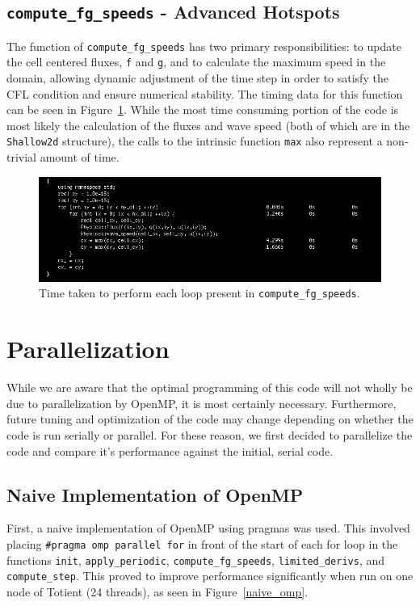 \documentclass[12pt]{article}
\begin{document}
		\subsection{\texttt{compute\_fg\_speeds} - Advanced Hotspots}
		The function of \texttt{compute\_fg\_speeds} has two primary responsibilities: to update the cell centered fluxes, \texttt{f} and \texttt{g}, and to calculate the maximum speed in the domain, allowing dynamic adjustment of the time step in order to satisfy the CFL condition and ensure numerical stability. The timing data for this function can be seen in Figure~\ref{init_compute_fg_speeds}. While the most time consuming portion of the code is most likely the calculation of the fluxes and wave speed (both of which are in the \texttt{Shallow2d} structure), the calls to the intrinsic function \texttt{max} also represent a non-trivial amount of time. 	
		\begin{figure}[h]
			\begin{center}
				\includegraphics[width=0.7\columnwidth]{init_compute_fg_speeds}
				\caption{Time taken to perform each loop present in \texttt{compute\_fg\_speeds}.}
				\label{init_compute_fg_speeds}
			\end{center}
		\end{figure}	
		
	\section{Parallelization}
	While we are aware that the optimal programming of this code will not wholly be due to parallelization by OpenMP, it is most certainly necessary. Furthermore, future tuning and optimization of the code may change depending on whether the code is run serially or parallel. For these reason, we first decided to parallelize the code and compare it's performance against the initial, serial code.
		\subsection{Naive Implementation of OpenMP}
		First, a naive implementation of OpenMP using pragmas was used. This involved placing \texttt{\#pragma omp parallel for} in front of the start of each for loop in the functions \texttt{init}, \texttt{apply\_periodic}, \texttt{compute\_fg\_speeds}, \texttt{limited\_derivs}, and \texttt{compute\_step}. This proved to improve performance significantly when run on one node of Totient (24 threads), as seen in Figure~\ref{naive_omp}. 
		
\end{document}
